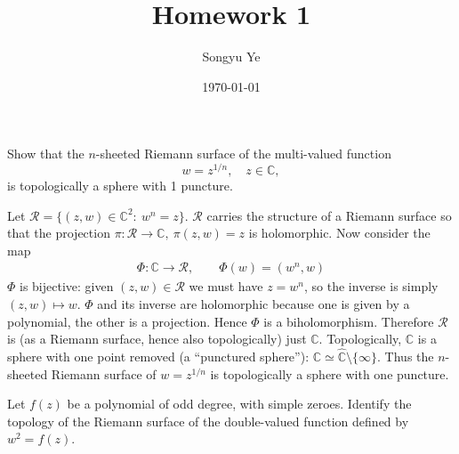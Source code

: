\documentclass[12pt]{article}  %
\title{Homework 1}
\author{Songyu Ye}
\date{\today}
\begin{document}
\psettitle


\begin{problem}{1}
Show that the $n$-sheeted Riemann surface of the multi-valued function
\[
    w = z^{1/n}, \quad z \in \mathbb{C},
\]
is topologically a sphere with 1 puncture.
\end{problem}

\begin{solution}
    Let $\mathcal{R}=\{(z,w)\in\mathbb C^2:\ w^n=z\}$. $\mathcal{R}$ carries the structure of a Riemann surface so that the projection
    $\pi:\mathcal{R}\to\mathbb{C},\ \pi(z,w)=z$ is holomorphic. Now consider the map \begin{align*}
        \Phi:\mathbb{C}\longrightarrow \mathcal{R},\qquad \Phi(w)=(w^n,w)
    \end{align*} $\Phi$ is bijective: given $(z,w)\in\mathcal{R}$ we must have $z=w^n$, so the inverse is simply $(z,w)\mapsto w$. $\Phi$ and its inverse are holomorphic because one is given by a polynomial, the other is a projection. Hence $\Phi$ is a biholomorphism. Therefore $\mathcal{R}$ is (as a Riemann surface, hence also topologically) just $\mathbb{C}$. Topologically, $\mathbb{C}$ is a sphere with one point removed (a “punctured sphere”): $\mathbb{C}\simeq \widehat{\mathbb{C}}\setminus\{\infty\}$. Thus the $n$-sheeted Riemann surface of $w=z^{1/n}$ is topologically a sphere with one puncture.
\end{solution}

\begin{problem}{2}
Let $f(z)$ be a polynomial of odd degree, with simple zeroes. Identify the topology of the Riemann surface of the double-valued function defined by $w^2 = f(z)$.
\end{problem}
\end{document}
